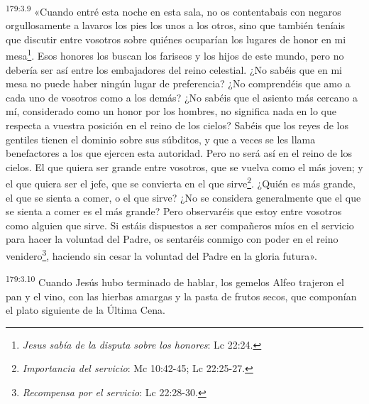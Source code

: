 \par
\textsuperscript{179:3.9} «Cuando entré esta noche en esta sala, no os contentabais con negaros orgullosamente a lavaros los pies los unos a los otros, sino que también teníais que discutir entre vosotros sobre quiénes ocuparían los lugares de honor en mi mesa\footnote{\textit{Jesus sabía de la disputa sobre los honores}: Lc 22:24.}. Esos honores los buscan los fariseos y los hijos de este mundo, pero no debería ser así entre los embajadores del reino celestial. ¿No sabéis que en mi mesa no puede haber ningún lugar de preferencia? ¿No comprendéis que amo a cada uno de vosotros como a los demás? ¿No sabéis que el asiento más cercano a mí, considerado como un honor por los hombres, no significa nada en lo que respecta a vuestra posición en el reino de los cielos? Sabéis que los reyes de los gentiles tienen el dominio sobre sus súbditos, y que a veces se les llama benefactores a los que ejercen esta autoridad. Pero no será así en el reino de los cielos. El que quiera ser grande entre vosotros, que se vuelva como el más joven; y el que quiera ser el jefe, que se convierta en el que sirve\footnote{\textit{Importancia del servicio}: Mc 10:42-45; Lc 22:25-27.}. ¿Quién es más grande, el que se sienta a comer, o el que sirve? ¿No se considera generalmente que el que se sienta a comer es el más grande? Pero observaréis que estoy entre vosotros como alguien que sirve. Si estáis dispuestos a ser compañeros míos en el servicio para hacer la voluntad del Padre, os sentaréis conmigo con poder en el reino venidero\footnote{\textit{Recompensa por el servicio}: Lc 22:28-30.}, haciendo sin cesar la voluntad del Padre en la gloria futura».

\par
\textsuperscript{179:3.10} Cuando Jesús hubo terminado de hablar, los gemelos Alfeo trajeron el pan y el vino, con las hierbas amargas y la pasta de frutos secos, que componían el plato siguiente de la Última Cena.

